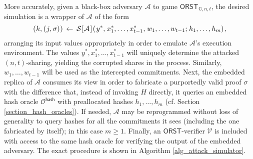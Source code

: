 \documentclass{iacrtrans}
\begin{document}
More accurately, given a black-box adversary $\mathcal{A}$
to game $\mathsf{ORST}_{\hspace{1pt}\mathbb{G}, n, t}$,
the desired simulation is a wrapper of $\mathcal{A}$ of the form
\vspace{5pt}
\begin{equation*}
	(
		\hspace{0.5pt}
		k,
		\hspace{0.5pt}
		(
			\hspace{0.5pt}
			j,
			\hspace{0.5pt}
			\sigma
		)
		\hspace{0.5pt}
	)
	\hspace{2pt}
	\leftarrow
	\hspace{2pt}
	\mathcal{S}
		\hspace{.5pt}
		[
			\hspace{0.5pt}
			\mathcal{A}
			\hspace{1pt}
		]
		\hspace{1pt}
		(
			\hspace{1pt}
			y ^*,
			\hspace{1pt}
			x_1^*, \dots, x_{t-1}^*,
			\hspace{1pt}
			w_1, \dots, w_{t-1};
			\hspace{1pt}
			h_1, \dots, h_m
		)\hspace{1pt},
\vspace{5pt}
\end{equation*}
arranging its input values appropriately
in order to emulate $\mathcal{A}$'s execution environment.
The values $y^*, x_1^*, \dots, x_{t-1}^*$
will uniquely determine the attacked $(n, t)$-sharing,
yielding the corrupted shares in the process.
Similarly, $w_1, \dots, w_{t-1}$ will be used
as the intercepted commitments.
Next, the embedded replica of $\mathcal{A}$
consumes its view in order to fabricate
a purportedly valid proof $\sigma$
with the difference that,
instead of invoking $H$ directly,
it queries an embedded hash oracle
$\mathcal{O}^{\mathsf{hash}}$
with preallocated hashes $h_1, \dots, h_{m}$
(cf. Section \ref{section_hash_oracles}).
If needed, $\mathcal{A}$ may be reprogrammed
without loss of generality
to query hashes for all the commitments it sees
(including the one fabricated by itself);
in this case $m \ge 1$.
Finally, an $\mathsf{ORST}$-verifier $\mathcal{V}$
is included with access to the same hash oracle for
verifying the output of the embedded adversary.
The exact procedure is shown in Algorithm \ref{alg_attack_simulator}.
\end{document}
